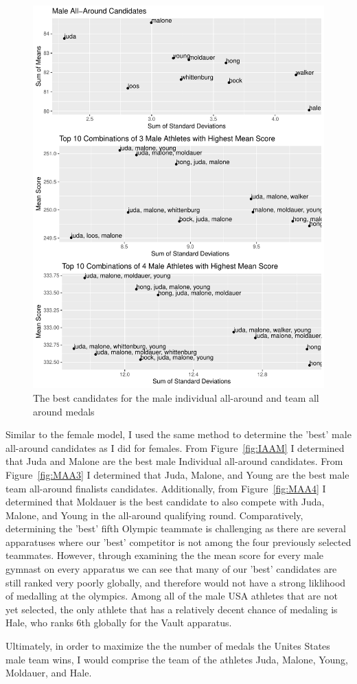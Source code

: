 \documentclass[12pt]{article}
\begin{document}
\begin{figure}
  \centering
  \includegraphics[scale=0.7]{MaleMultipleAllAround.pdf}
  \caption{The best candidates for the male individual all-around and team all around medals}
  \label{fig:FAA}
\end{figure}


Similar to the female model, I used the same method to determine the 'best' male all-around candidates as I did for females. From 
Figure~\ref{fig:IAAM} I determined that Juda and Malone are the best male Individual all-around candidates. From 
Figure~\ref{fig:MAA3} I determined that Juda, Malone, and Young are the best male team all-around finalists 
candidates. Additionally, from Figure~\ref{fig:MAA4} I determined that Moldauer is the best candidate to also compete 
with Juda, Malone, and Young in the all-around qualifying round. Comparatively, determining the 'best' fifth Olympic 
teammate is challenging as there are several apparatuses where our 'best' competitor is not among the four 
previously selected teammates. However, through examining the the mean score for every male gymnast on every apparatus 
we can see that many of our 'best' candidates are still ranked very poorly globally, and therefore would not have a 
strong liklihood of medalling at the olympics. Among all of the male USA athletes that are not yet selected, the only 
athlete that has a relatively decent chance of medaling is Hale, who ranks 6th globally for the Vault apparatus.

Ultimately, in order to maximize the the number of medals the Unites States male team wins, I would comprise the 
team of the athletes Juda, Malone, Young, Moldauer, and Hale.



\end{document}
